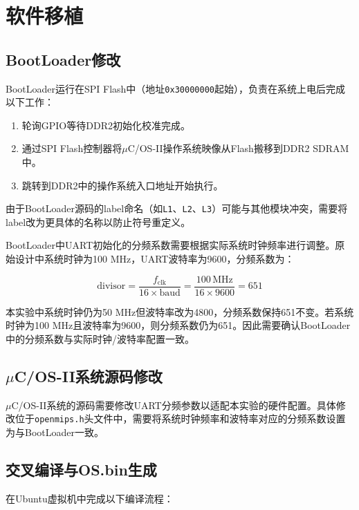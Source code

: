\section{软件移植}

\subsection{BootLoader修改}

BootLoader运行在SPI Flash中（地址\texttt{0x30000000}起始），负责在系统上电后完成以下工作：

\begin{enumerate}[leftmargin=2em]
    \item 轮询GPIO等待DDR2初始化校准完成。
    \item 通过SPI Flash控制器将$\mu$C/OS-II操作系统映像从Flash搬移到DDR2 SDRAM中。
    \item 跳转到DDR2中的操作系统入口地址开始执行。
\end{enumerate}

由于BootLoader源码的label命名（如\texttt{L1}、\texttt{L2}、\texttt{L3}）可能与其他模块冲突，需要将label改为更具体的名称以防止符号重定义。

BootLoader中UART初始化的分频系数需要根据实际系统时钟频率进行调整。原始设计中系统时钟为100 MHz，UART波特率为9600，分频系数为：

\[
\text{divisor} = \frac{f_{\text{clk}}}{16 \times \text{baud}} = \frac{100\,\text{MHz}}{16 \times 9600} = 651
\]

本实验中系统时钟仍为50 MHz但波特率改为4800，分频系数保持651不变。若系统时钟为100 MHz且波特率为9600，则分频系数仍为651。因此需要确认BootLoader中的分频系数与实际时钟/波特率配置一致。

\subsection{$\mu$C/OS-II系统源码修改}

$\mu$C/OS-II系统的源码需要修改UART分频参数以适配本实验的硬件配置。具体修改位于\texttt{openmips.h}头文件中，需要将系统时钟频率和波特率对应的分频系数设置为与BootLoader一致。

\subsection{交叉编译与OS.bin生成}

在Ubuntu虚拟机中完成以下编译流程：

